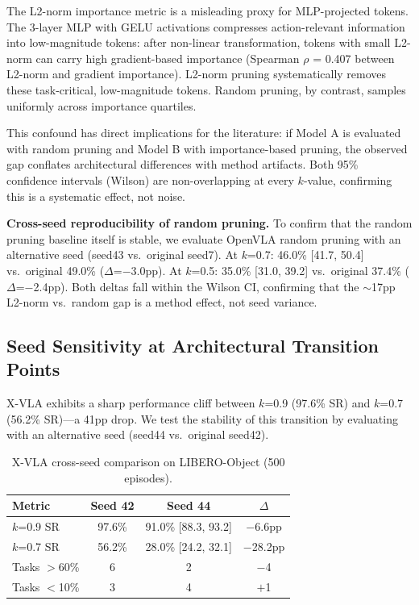 \documentclass[letterpaper]{article}
\begin{document}
The L2-norm importance metric is a misleading proxy for MLP-projected tokens.
The 3-layer MLP with GELU activations compresses action-relevant information into low-magnitude tokens: after non-linear transformation, tokens with small L2-norm can carry high gradient-based importance (Spearman $\rho$ = 0.407 between L2-norm and gradient importance).
L2-norm pruning systematically removes these task-critical, low-magnitude tokens.
Random pruning, by contrast, samples uniformly across importance quartiles.

This confound has direct implications for the literature: if Model A is evaluated with random pruning and Model B with importance-based pruning, the observed gap conflates architectural differences with method artifacts.
Both 95\% confidence intervals (Wilson) are non-overlapping at every $k$-value, confirming this is a systematic effect, not noise.

\textbf{Cross-seed reproducibility of random pruning.}
To confirm that the random pruning baseline itself is stable, we evaluate OpenVLA random pruning with an alternative seed (seed43 vs.\ original seed7).
At $k$=0.7: 46.0\% [41.7, 50.4] vs.\ original 49.0\% ($\Delta$=$-$3.0pp).
At $k$=0.5: 35.0\% [31.0, 39.2] vs.\ original 37.4\% ($\Delta$=$-$2.4pp).
Both deltas fall within the Wilson CI, confirming that the $\sim$17pp L2-norm vs.\ random gap is a method effect, not seed variance.

\subsection{Seed Sensitivity at Architectural Transition Points}
\label{sec:seed}

X-VLA exhibits a sharp performance cliff between $k$=0.9 (97.6\% SR) and $k$=0.7 (56.2\% SR)---a 41pp drop.
We test the stability of this transition by evaluating with an alternative seed (seed44 vs.\ original seed42).

\begin{table}[h]
\centering
\caption{X-VLA cross-seed comparison on LIBERO-Object (500 episodes).}
\label{tab:xvla_seed}
\begin{tabular}{lccc}
\toprule
\textbf{Metric} & \textbf{Seed 42} & \textbf{Seed 44} & \textbf{$\Delta$} \\
\midrule
$k$=0.9 SR & 97.6\% & 91.0\% [88.3, 93.2] & $-$6.6pp \\
$k$=0.7 SR & 56.2\% & 28.0\% [24.2, 32.1] & $-$28.2pp \\
Tasks $>$60\% & 6 & 2 & $-$4 \\
Tasks $<$10\% & 3 & 4 & $+$1 \\
\bottomrule
\end{tabular}
\end{table}
\end{document}
